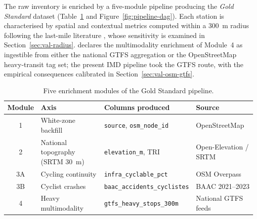 \documentclass[11pt,a4paper]{article}
\begin{document}
The raw inventory is enriched by a five-module pipeline producing
the \emph{Gold Standard} dataset (Table~\ref{tab:pipeline} and
Figure~\ref{fig:pipeline-dag}). Each station is characterised by
spatial and contextual metrics computed within a 300~m radius
following the last-mile literature \citep{ElGeneidy2016,
Saberi2018}, whose sensitivity is examined in
Section~\ref{sec:val-radius}.
\citet{Fosse2026gold} declares the multimodality enrichment of
Module~4 as ingestible from either the national GTFS aggregation
or the OpenStreetMap heavy-transit tag set; the present IMD
pipeline took the GTFS route, with the empirical consequences
calibrated in Section~\ref{sec:val-osm-gtfs}.

\begin{table}[H]
\centering
\caption{Five enrichment modules of the Gold Standard pipeline.}
\label{tab:pipeline}
\small
\begin{tabular}{@{}clp{5.4cm}l@{}}
\toprule
Module & Axis & Columns produced & Source \\
\midrule
1  & White-zone backfill &
     \texttt{source}, \texttt{osm\_node\_id} & OpenStreetMap \\
2  & National topography (SRTM 30~m) &
     \texttt{elevation\_m}, TRI & Open-Elevation / SRTM \\
3A & Cycling continuity &
     \texttt{infra\_cyclable\_pct} & OSM Overpass \\
3B & Cyclist crashes &
     \texttt{baac\_accidents\_cyclistes} & BAAC 2021--2023 \\
4  & Heavy multimodality &
     \texttt{gtfs\_heavy\_stops\_300m} & National GTFS feeds \\
\bottomrule
\end{tabular}
\end{table}
\end{document}
